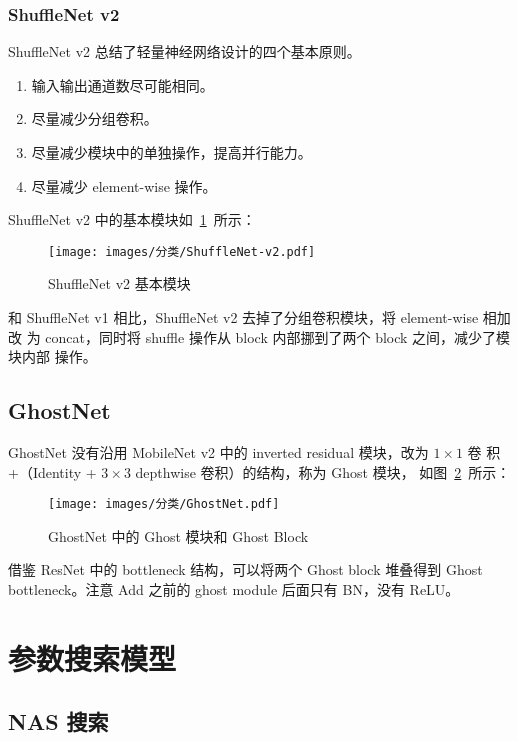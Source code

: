 \subsection{ShuffleNet v2}
ShuffleNet v2 总结了轻量神经网络设计的四个基本原则。

\begin{enumerate}
  \item 输入输出通道数尽可能相同。
  \item 尽量减少分组卷积。
  \item 尽量减少模块中的单独操作，提高并行能力。
  \item 尽量减少 element-wise 操作。
\end{enumerate}

ShuffleNet v2 中的基本模块如~\ref{fig:shufflenet-v2}~所示：

\begin{figure}[ht]
  \centering
  \texttt{[image: images/分类/ShuffleNet-v2.pdf]}
  \caption{ShuffleNet v2 基本模块}\label{fig:shufflenet-v2}
\end{figure}

和 ShuffleNet v1 相比，ShuffleNet v2 去掉了分组卷积模块，将 element-wise 相加改
为 concat，同时将 shuffle 操作从 block 内部挪到了两个 block 之间，减少了模块内部
操作。

\section{GhostNet}
GhostNet 没有沿用 MobileNet v2 中的 inverted residual 模块，改为 $1 \times 1$ 卷
积 +（Identity + $3 \times 3$ depthwise 卷积）的结构，称为 Ghost 模块，
如图~\ref{fig:ghostnet}~所示：

\begin{figure}[ht]
  \centering
  \texttt{[image: images/分类/GhostNet.pdf]}
  \caption{GhostNet 中的 Ghost 模块和 Ghost Block}\label{fig:ghostnet}
\end{figure}

借鉴 ResNet 中的 bottleneck 结构，可以将两个 Ghost block 堆叠得到 Ghost
bottleneck。注意 Add 之前的 ghost module 后面只有 BN，没有 ReLU。

\chapter{参数搜索模型}

\section{NAS 搜索}

